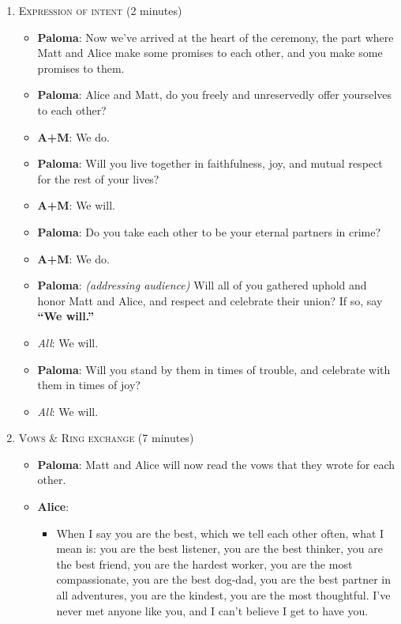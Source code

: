 \documentclass[12pt]{article}
\begin{document}
\begin{enumerate}
\begin{itemize}
\begin{itemize}
    \end{itemize}

  \end{itemize}

\item \textsc{Expression of intent} (2 minutes)
  \begin{itemize}
  \item {\bf Paloma}: Now we've arrived at the heart of the ceremony, the part where Matt and Alice make some promises to each other, and you make some promises to them.

  \item {\bf Paloma}: Alice and Matt, do you freely and unreservedly offer yourselves to each other?

  \item {\bf A+M}: We do.

  \item {\bf Paloma}: Will you live together in faithfulness, joy, and mutual respect for the rest of your lives?

  \item {\bf A+M}: We will.

  \item {\bf Paloma}: Do you take each other to be your eternal partners in crime?

  \item {\bf A+M}: We do.

  \item {\bf Paloma}: \textit{(addressing audience)} Will all of you gathered uphold and honor Matt and Alice, and respect and celebrate their union? If so, say \textbf{``We will.''}

  \item \textit{All}: We will.

  \item \textbf{Paloma}: Will you stand by them in times of trouble, and celebrate with them in times of joy?

  \item \textit{All}: We will. 
  \end{itemize}

\item \textsc{Vows \& Ring exchange} (7 minutes)
  \begin{itemize}
  \item {\bf Paloma}: Matt and Alice will  now read the vows that they wrote for each other.

  \item {\bf Alice}:
    \begin{itemize}
    \item When I say you are the best, which we tell each other often, what I mean is: you are the best listener, you are the best thinker, you are the best friend, you are the hardest worker, you are the most compassionate, you are the best dog-dad, you are the best partner in all adventures, you are the kindest, you are the most thoughtful. I've never met anyone like you, and I can't believe I get to have you. 
  

\end{itemize}
\end{itemize}
\end{enumerate}
\end{document}
